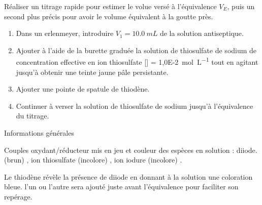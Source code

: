 \documentclass[a4paper,11pt,fleqn]{scrartcl}%
\begin{document}
\begin{minipage}{0.49\linewidth}
    \begin{protocole}
        Réaliser un titrage rapide pour estimer le volue versé à l'équivalence $V_E$, puis un second plus précis pour avoir le volume équivalent à la goutte près.
        \begin{enumerate}
            \item Dans un erlenmeyer, introduire $V_1 = \SI{10,0}{mL}$ de la solution antiseptique.
            \item Ajouter à l'aide de la burette graduée la solution de thiosulfate de sodium de concentration effective en ion thiosulfate [] = \SI{1,0E-2}{mol.L^{-1}} tout en agitant jusqu'à obtenir une teinte jaune pâle persistante.
            \item Ajouter une pointe de spatule de thiodène.
            \item Continuer à verser la solution de thiosulfate de sodium jusqu'à l'équivalence du titrage.
        \end{enumerate}
    \end{protocole}
    \begin{documentboxenv}{Informations générales}
    \begin{itemize*}
        \item Couples oxydant/réducteur mis en jeu et couleur des espèces en solution : diiode. (brun) , ion thiosulfate (incolore) , ion iodure (incolore) .
        \item Le thiodène révèle la présence de diiode en donnant à la solution une coloration bleue. l'un ou l'autre sera ajouté juste avant l'équivalence pour faciliter son repérage.
    \end{itemize*}
    \end{documentboxenv}
\end{minipage}
    
    
\end{document}
